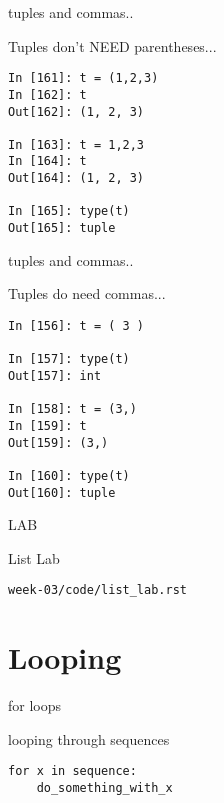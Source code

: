 \documentclass{beamer}
\begin{document}
\begin{frame}[fragile]{tuples and commas..}

{\Large  Tuples don't NEED parentheses... }

\begin{verbatim}
In [161]: t = (1,2,3)
In [162]: t
Out[162]: (1, 2, 3)

In [163]: t = 1,2,3
In [164]: t
Out[164]: (1, 2, 3)

In [165]: type(t)
Out[165]: tuple
\end{verbatim}

\end{frame}

\begin{frame}[fragile]{tuples and commas..}

{\Large  Tuples do need commas... }

\begin{verbatim}
In [156]: t = ( 3 )

In [157]: type(t)
Out[157]: int

In [158]: t = (3,)
In [159]: t
Out[159]: (3,)

In [160]: type(t)
Out[160]: tuple
\end{verbatim}

\end{frame}


\begin{frame}[fragile]{LAB}

\vfill
{\LARGE List Lab}

\vfill
\verb|week-03/code/list_lab.rst|

\vfill

\end{frame}

\section{Looping}

\begin{frame}[fragile]{for loops}

{\Large looping through sequences

\begin{verbatim}
for x in sequence:
    do_something_with_x
\end{verbatim}
}
\end{frame}
\end{document}
